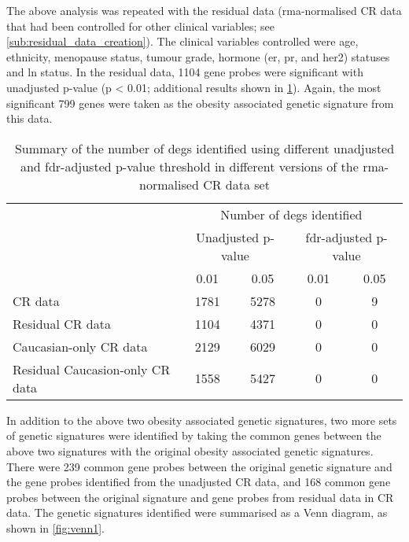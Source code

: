 The above analysis was repeated with the residual data (\gls{rma}-normalised CR data that had been controlled for other clinical variables; see \cref{sub:residual_data_creation}).
The clinical variables controlled were age, ethnicity, menopause status, tumour grade, hormone (\gls{er}, \gls{pr}, and \gls{her2}) statuses  and \gls{ln} status.
In the residual data, 1104 gene probes were significant with unadjusted p-value (p \textless{} 0.01; additional results shown in \cref{tab:ob_deg_summary}).
Again, the most significant 799 genes were taken as the obesity associated genetic signature from this data.

\begin{table}[htpb]
	\centering
	\caption[Summary of the number of \acrshort{deg}s identified using different unadjusted and \acrshort{fdr}-adjusted p-value threshold in different versions of the \gls{rma}-normalised CR data set]{Summary of the number of \glspl{deg} identified using different unadjusted and \gls{fdr}-adjusted p-value threshold in different versions of the \gls{rma}-normalised CR data set}
	\label{tab:ob_deg_summary}
	\begin{tabular}{lcccc}
		& \multicolumn{4}{c}{Number of \glspl{deg} identified}\\
		\cmidrule(r){2-5}
		& \multicolumn{2}{c}{Unadjusted p-value} & \multicolumn{2}{c}{\gls{fdr}-adjusted p-value}\\
		\cmidrule(r){2-3} \cmidrule(r){4-5}
		& 0.01 & 0.05 & 0.01 & 0.05\\
		\hline
		\hline
		\rule{0pt}{2.25ex}CR data       & 1781 & 5278 & 0 & 9 \\
		Residual CR data                & 1104 & 4371 & 0 & 0 \\
		Caucasian-only CR data          & 2129 & 6029 & 0 & 0 \\
		Residual Caucasion-only CR data & 1558 & 5427 & 0 & 0 \\
		\hline
		\hline
	\end{tabular}
\end{table}

In addition to the above two obesity associated genetic signatures, two more sets of genetic signatures were identified by taking the common genes between the above two signatures with the original obesity associated genetic signatures.
There were 239 common gene probes between the original genetic signature and the gene probes identified from the unadjusted CR data, and 168 common gene probes between the original signature and gene probes from residual data in CR data.
The genetic signatures identified were summarised as a Venn diagram, as shown in \cref{fig:venn1}.
\\

